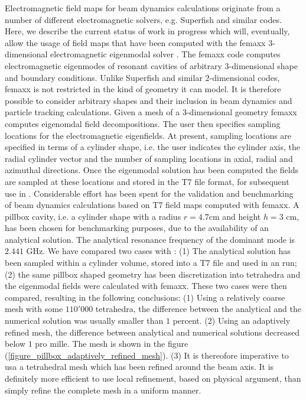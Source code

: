 Electromagnetic field maps for beam dynamics calculations originate from a number of different
electromagnetic solvers, e.g. Superfish and similar codes.
Here, we describe the current status of work in progress which will, eventually,
allow the usage of field maps that have been computed with the femaxx $3$-dimensional
electromagnetic eigenmodal solver \cite{bib:arbenzetal2001,bib:arbenzetal2006}.
The femaxx code computes electromagnetic eigenmodes of resonant cavities of
arbitrary $3$-dimensional shape and boundary conditions.
Unlike Superfish and similar $2$-dimensional codes, femaxx is not restricted in the
kind of geometry it can model. It is therefore possible to consider arbitrary
shapes and their inclusion in beam dynamics and particle tracking calculations.
Given a mesh of a $3$-dimensional geometry femaxx computes eigenomdal field
decompositions.
The user then specifies sampling locations for the electromagnetic eigenfields.
At present, sampling locations are specified in terms of a cylinder shape,
i.e. the user indicates the cylinder axis, the radial cylinder vector and 
the number of sampling locations in axial, radial and azimuthal directions.
Once the eigenmodal solution has been computed the fields are sampled at
these locations and stored in the T7 file format, for subsequent use in \opal.
Considerable effort has been spent for the validation and benchmarking of
beam dynamics calculations based on T7 field maps computed with femaxx.
A pillbox cavity, i.e. a cylinder shape with a radius $r = 4.7$cm and
height $h = 3$ cm, has been chosen for benchmarking purposes,
due to the availability of an analytical solution.
The analytical resonance frequency of the dominant mode is $2.441$ GHz.
We have compared two cases with \opal: (1) The analytical solution has been
sampled within a cylinder volume, stored into a T7 file and used in an \opal
run; (2) the same pillbox shaped geometry has been discretization into tetrahedra
and the eigenmodal fields were calculated with femaxx.
These two cases were then compared, resulting in the following conclusions:
(1) Using a relatively coarse mesh with some $110'000$ tetrahedra, the difference
between the analytical and the numerical solution was usually smaller than
$1$ percent.
(2) Using an adaptively refined mesh, the difference between analytical and
numerical solutions decreased below $1$ pro mille. The mesh is shown
in the figure (\ref{figure_pillbox_adaptively_refined_mesh}).
(3) It is thereofore imperative to usa a tetrahedral mesh which has been
refined around the beam axis. It is definitely more efficient to use local
refinement, based on physical argument, than simply refine the complete
mesh in a uniform manner.


